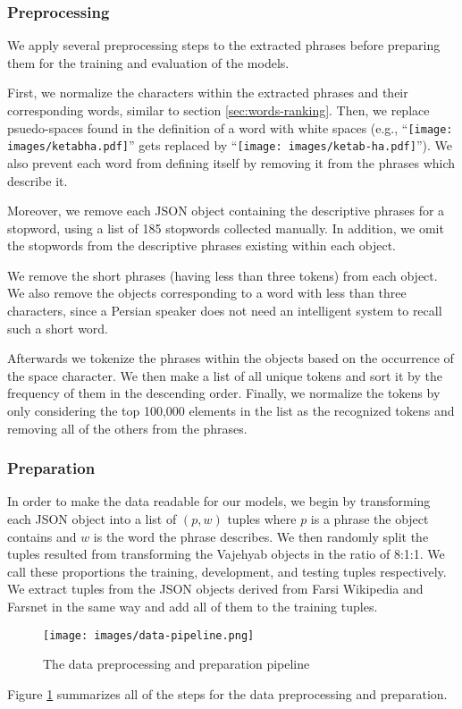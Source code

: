 \documentclass{article}
\begin{document}
\subsubsection{Preprocessing}
We apply several preprocessing steps to the extracted phrases before preparing them for the training and evaluation of the models.

First, we normalize the characters within the extracted phrases and their corresponding words, similar to section \ref{sec:words-ranking}. Then, we replace psuedo-spaces found in the definition of a word with white spaces (e.g., ``\texttt{[image: images/ketabha.pdf]}'' gets replaced by ``\texttt{[image: images/ketab-ha.pdf]}''). We also prevent each word from defining itself by removing it from the phrases which describe it.

Moreover, we remove each JSON object containing the descriptive phrases for a stopword, using a list of 185 stopwords collected manually. In addition, we omit the stopwords from the descriptive phrases existing within each object.

We remove the short phrases (having less than three tokens) from each object. We also remove the objects corresponding to a word with less than three characters, since a Persian speaker does not need an intelligent system to recall such a short word.

Afterwards we tokenize the phrases within the objects based on the occurrence of the space character. We then make a list of all unique tokens and sort it by the frequency of them in the descending order. Finally, we normalize the tokens by only considering the top 100,000 elements in the list as the recognized tokens and removing all of the others from the phrases.
\subsubsection{Preparation}
In order to make the data readable for our models, 
we begin by transforming each JSON object into a list of $(p,w)$ tuples where $p$ is a phrase the object contains and $w$ is the word the phrase describes. We then randomly split the tuples resulted from transforming the Vajehyab objects in the ratio of 8:1:1. We call these proportions the training, development, and testing tuples respectively. We extract tuples from the JSON objects derived from Farsi Wikipedia and Farsnet in the same way and add all of them to the training tuples.
\begin{figure}
	\centering
	\caption{The data preprocessing and preparation pipeline}
	\texttt{[image: images/data-pipeline.png]}
	\label{fig:data-pipeline}
\end{figure}
Figure \ref{fig:data-pipeline} summarizes all of the steps for the data preprocessing and preparation.
\end{document}
